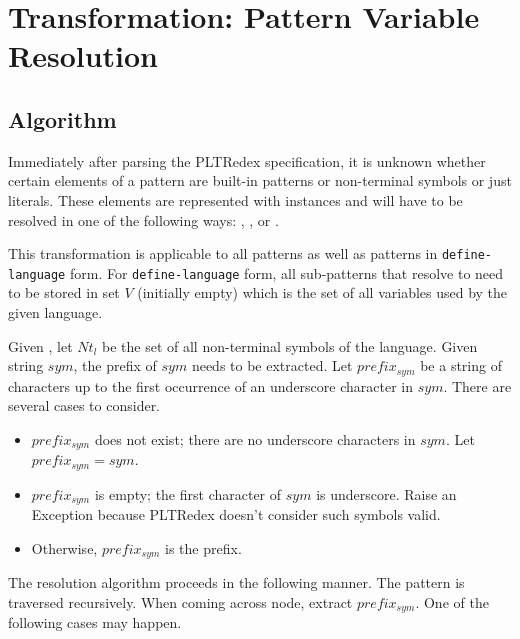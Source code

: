 \section{Transformation: Pattern Variable Resolution}
\label{section:pv-resolve}

\subsection{Algorithm}

Immediately after parsing the PLTRedex specification, it is unknown whether certain elements of a pattern are built-in patterns or non-terminal symbols or just literals. These elements are represented with \UnresolvedSymbol instances and will have to be resolved in one of the following ways: \BuiltInPatternNoArg, \NonTerminalNoArg, or \LiteralPatternNoArg.

This transformation is applicable to all patterns as well as patterns in \texttt{define-language} form. For \texttt{define-language} form, all sub-patterns that resolve to \LiteralPatternNoArg need to be stored in set $V$ (initially empty) which is the set of all variables used by the given language.

Given , let $\mathit{Nt_{l}}$ be the set of all non-terminal symbols of the language. Given string $sym$, the prefix of $\mathit{sym}$ needs to be extracted. Let $\mathit{prefix_{sym}}$ be a string of characters up to the first occurrence of an underscore character in $\mathit{sym}$. There are several cases to consider.

\begin{itemize}
\item $\mathit{prefix_{sym}}$ does not exist; there are no underscore characters in $\mathit{sym}$. Let $\mathit{prefix_{sym}=sym}$.
\item $\mathit{prefix_{sym}}$ is empty; the first character of $\mathit{sym}$ is underscore. Raise an Exception because PLTRedex doesn't consider such symbols valid.
\item Otherwise, $\mathit{prefix_{sym}}$ is the prefix.
\end{itemize}

The resolution algorithm proceeds in the following manner. The pattern is traversed recursively. When coming across \UnresolvedSymbol node, extract $prefix_{sym}$. One of the following cases may happen.

